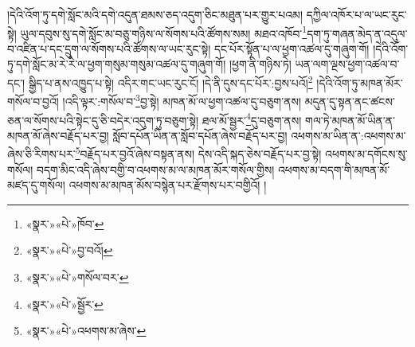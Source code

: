 །དེའི་འོག་ཏུ་དགེ་སློང་མའི་དགེ་འདུན་ཐམས་ཅད་འདུག་ཅིང་མཐུན་པར་གྱུར་པའམ། དཀྱིལ་འཁོར་པ་ལ་ཡང་རུང་སྟེ། ཡུལ་དབུས་སུ་དགེ་སློང་མ་བཅུ་གཉིས་ལ་སོགས་པའི་ཚོགས་སམ། མཐའ་འཁོབ་\footnote{«སྣར་»«པེ་»ཁོབ་}དག་ཏུ་གཞན་མེད་ན་འདུལ་བ་འཛིན་པ་དང་དྲུག་ལ་སོགས་པའི་ཚོགས་ལ་ཡང་རུང་སྟེ། དང་པོར་སྟོན་པ་ལ་ཕྱག་འཚལ་དུ་གཞུག་གོ། །དེའི་འོག་ཏུ་དགེ་སློང་མ་རེ་རེ་ལ་ཕྱག་གསུམ་གསུམ་འཚལ་དུ་གཞུག་གོ། །ཕྱག་ནི་གཉིས་ཏེ། ཡན་ལག་ལྔས་ཕྱག་འཚལ་བ་དང་། སྒྱིད་པ་ནས་འཁྱུད་པ་སྟེ། འདིར་གང་ཡང་རུང་ངོ། །དེ་ནི་དུས་དང་པོར་:བྱས་པའོ།\footnote{«སྣར་»«པེ་»བྱ་བའོ།} །དེའི་འོག་ཏུ་མཁན་མོར་གསོལ་བ་བྱའོ། །འདི་ལྟར་:གསོལ་བ་\footnote{«སྣར་»«པེ་»གསོལ་བར་}བྱ་སྟེ། མཁན་མོ་ལ་ཕྱག་འཚལ་དུ་བཅུག་ནས། མདུན་དུ་སྟན་ནང་ཚངས་ཅན་ལ་སོགས་པའི་སྟེང་དུ་ཅི་བདེར་འདུག་ཏུ་བཅུག་སྟེ། ཐལ་མོ་སྦྱར་\footnote{«སྣར་»«པེ་»སྦྱོར་}དུ་བཅུག་ནས། གལ་ཏེ་མཁན་མོ་ཡིན་ན་མཁན་མོ་ཞེས་བརྗོད་པར་བྱ། སློབ་དཔོན་ཡིན་ན་སློབ་དཔོན་ཞེས་བརྗོད་པར་བྱ། འཕགས་མ་ཡིན་ན་:འཕགས་མ་ཞེས་ཅི་རིགས་པར་\footnote{«སྣར་»«པེ་»འཕགས་མ་ཞེས་}བརྗོད་པར་བྱའོ་ཞེས་བསྟན་ནས། དེས་འདི་སྐད་ཅེས་བརྗོད་པར་བྱ་སྟེ། འཕགས་མ་དགོངས་སུ་གསོལ། བདག་མིང་འདི་ཞེས་བགྱི་བ་འཕགས་མ་ལ་མཁན་མོར་གསོལ་གྱིས། འཕགས་མ་བདག་གི་མཁན་མོ་མཛད་དུ་གསོལ། འཕགས་མ་མཁན་མོས་བསྙེན་པར་རྫོགས་པར་བགྱིའོ། །
